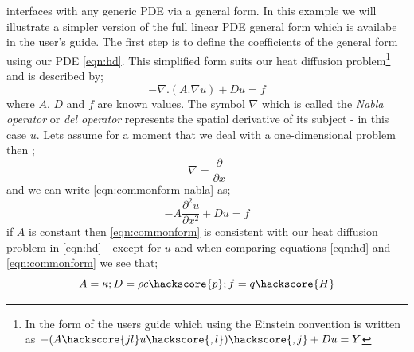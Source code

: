 \ESCRIPT interfaces with any generic PDE via a general form. In this example we will illustrate a simpler version of the full linear PDE general form which is availabe in the user's guide. The first step is to define the coefficients of the general form using our PDE \ref{eqn:hd}. This simplified form suits our heat diffusion problem\footnote{In the form of the \ESCRIPT users guide which using the Einstein convention is written as 
$-(A\hackscore{jl} u\hackscore{,l})\hackscore{,j}+D u =Y$}
and is described by;
\begin{equation}\label{eqn:commonform nabla}
-\nabla.(A.\nabla u) + Du = f
\end{equation}
where $A$, $D$ and $f$ are known values. The symbol $\nabla$ which is called the \textit{Nabla operator} or \textit{del operator} represents
the spatial derivative of its subject - in this case $u$. Lets assume for a moment that we deal with a one-dimensional problem then ;
\begin{equation}
\nabla = \frac{\partial}{\partial x}
\end{equation}
and we can write \ref{eqn:commonform nabla} as;
\begin{equation}\label{eqn:commonform}
-A\frac{\partial^{2}u}{\partial x^{2}} + Du = f
\end{equation}
if $A$ is constant then  \ref{eqn:commonform} is consistent with our heat diffusion problem in \ref{eqn:hd} - except for $u$ and when comparing equations \ref{eqn:hd} and \ref{eqn:commonform} we see that;
\begin{equation}
A = \kappa; D = \rho c \hackscore{p}; f = q \hackscore{H}
\end{equation}

